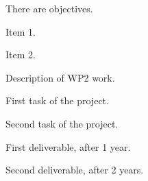 \begin{workpackage}[id=WP2ID,wphases=0-48,
  short=First act. WP,%
  title=First actual Work Package,
  lead=KUL,
  KULRM=12,
  PAR3RM=6,
  PAR3RM=24]

\begin{wpobjectives}
  There are objectives.
  \begin{compactitem}
  \item Item 1.
  \item Item 2.
  \end{compactitem}
\end{wpobjectives}

\begin{wpdescription}
  Description of WP2 work.
\end{wpdescription}

\begin{tasklist}

  \begin{task}[title=TASK1,id=task1,PM=15,lead=KUL,wphases=0-30!0.5]

    First task of the project.
    
  \end{task}

  \begin{task}[title=TASK2,id=task2,PM=15,lead=PAR3,wphases=12-42!0.5]

    Second task of the project.
    
  \end{task}

\end{tasklist}

\begin{wpdelivs}
  \begin{wpdeliv}[due=12,id=mydeliv1,dissem=PU,nature=DEM,lead=KUL]
      {First deliverable, after 1 year.}
  \end{wpdeliv}
  \begin{wpdeliv}[due=24,id=mydeliv2,dissem=PU,nature=DEM,lead=PAR3]
      {Second deliverable, after 2 years.}
\end{wpdeliv}
\end{wpdelivs}

\end{workpackage}
